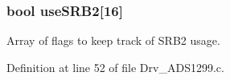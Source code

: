 \subsubsection[{\texorpdfstring{use\+S\+R\+B2}{useSRB2}}]{\setlength{\rightskip}{0pt plus 5cm}bool use\+S\+R\+B2\mbox{[}16\mbox{]}}\hypertarget{group__ADS1299__Library_ga96bc68ed80305391fa5bbcc88557d776}{}\label{group__ADS1299__Library_ga96bc68ed80305391fa5bbcc88557d776}


Array of flags to keep track of S\+R\+B2 usage. 



Definition at line 52 of file Drv\+\_\+\+A\+D\+S1299.\+c.

